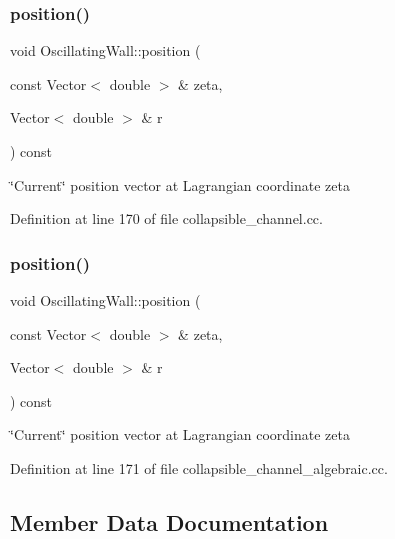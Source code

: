 \subsubsection{\texorpdfstring{position()}{position()}\hspace{0.1cm}{\footnotesize\ttfamily [3/4]}}
{\footnotesize\ttfamily void Oscillating\+Wall\+::position (\begin{DoxyParamCaption}\item[{const Vector$<$ double $>$ \&}]{zeta,  }\item[{Vector$<$ double $>$ \&}]{r }\end{DoxyParamCaption}) const\hspace{0.3cm}{\ttfamily [inline]}}



\char`\"{}\+Current\char`\"{} position vector at Lagrangian coordinate zeta 



Definition at line 170 of file collapsible\+\_\+channel.\+cc.

\mbox{\label{classOscillatingWall_a5fce6728f975003d9e85f64c18ba7f55}} 
\subsubsection{\texorpdfstring{position()}{position()}\hspace{0.1cm}{\footnotesize\ttfamily [4/4]}}
{\footnotesize\ttfamily void Oscillating\+Wall\+::position (\begin{DoxyParamCaption}\item[{const Vector$<$ double $>$ \&}]{zeta,  }\item[{Vector$<$ double $>$ \&}]{r }\end{DoxyParamCaption}) const\hspace{0.3cm}{\ttfamily [inline]}}



\char`\"{}\+Current\char`\"{} position vector at Lagrangian coordinate zeta 



Definition at line 171 of file collapsible\+\_\+channel\+\_\+algebraic.\+cc.



\subsection{Member Data Documentation}
\mbox{\label{classOscillatingWall_ac22b6ac70a42850ddbe2e9c4c16f4664}} 
